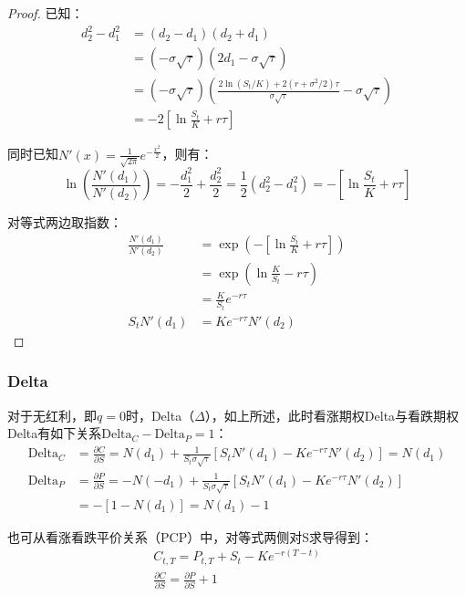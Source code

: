\documentclass[11pt]{article}
\begin{document}
\begin{proof}
    已知：
    \begin{align*}
        d_2^2-d_1^2 &= (d_2-d_1)(d_2+d_1) \\
        &= (-\sigma\sqrt{\tau})(2d_1-\sigma\sqrt{\tau}) \\
        &= (-\sigma\sqrt{\tau})\left(\frac{2\ln(S_t/K) + 2(r+\sigma^2/2)\tau}{\sigma\sqrt{\tau}} -\sigma\sqrt{\tau}\right) \\
        &= -2\left[\ln\frac{S_t}{K}+r\tau\right]
    \end{align*}

    同时已知$N'(x)=\frac{1}{\sqrt{2\pi}} e^{-\frac{x^2}{2}}$，则有：
    \begin{equation*}
        \ln\left(\frac{N'(d_1)}{N'(d_2)}\right)
        = -\frac{d_1^2}{2} + \frac{d_2^2}{2}
        = \frac{1}{2} (d_2^2-d_1^2)
        = -\left[\ln\frac{S_t}{K} +r\tau\right]
    \end{equation*}

    对等式两边取指数：
    \begin{align*}
        \frac{N'(d_1)}{N'(d_2)} 
        &= \exp\left( -\left[\ln\frac{S_t}{K} +r\tau\right] \right) \\
        &= \exp \left( \ln\frac{K}{S_t}-r\tau \right) \\
        &= \frac{K}{S_t} e^{-r\tau} \\
        S_t N'(d_1) &= Ke^{-r\tau} N'(d_2)
    \end{align*}
\end{proof}

\subsubsection{Delta}

对于无红利，即$q=0$时，Delta（$\Delta$），如上所述，此时看涨期权Delta与看跌期权Delta有如下关系$\text{Delta}_C - \text{Delta}_P = 1$：
\begin{align*}
    \text{Delta}_C &= \frac{\partial C}{\partial S}
    = N(d_1) + \frac{1}{S_t\sigma\sqrt{\tau}} \left[ S_t N'(d_1)-Ke^{-r\tau}N'(d_2) \right] = N(d_1) \\
    \text{Delta}_P &= \frac{\partial P}{\partial S}
    = -N(-d_1) + \frac{1}{S_t\sigma\sqrt{\tau}} \left[ S_t N'(d_1)-Ke^{-r\tau}N'(d_2) \right] \\
    &= -\left[ 1- N(d_1) \right] = N(d_1)-1
\end{align*}

也可从看涨看跌平价关系（PCP）中，对等式两侧对S求导得到：
\begin{gather*}
    C_{t,T} = P_{t,T} +  S_t - K e^{-r(T-t)} \\
    \frac{\partial C}{\partial S} = \frac{\partial P}{\partial S} + 1
\end{gather*}
\end{document}
